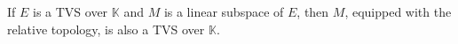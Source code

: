 If $E$ is a TVS over $\mathbb{K}$ and $M$ is a linear subspace of $E$, then $M$, equipped with the relative topology, is also a TVS over $\mathbb{K}$.
